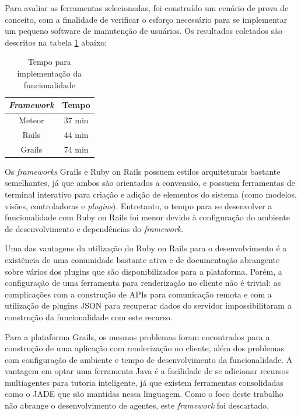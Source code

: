 Para avaliar as ferramentas selecionadas, foi construído um cenário de prova de conceito, com a finalidade de verificar o esforço necessário para se implementar um pequeno software de manutenção de usuários. Os resultados coletados são descritos na tabela \ref{tab:tempo} abaixo:

\begin{table}[h!]
	\centering
	\begin{tabular}{| c | c |}
		\hline
		\textit{Framework} & Tempo \\
		\hline
		Meteor & 37 min \\
		\hline
		Rails & 44 min \\
		\hline
		Grails & 74 min \\
		\hline
	\end{tabular}
	\caption{Tempo para implementação da funcionalidade}
	\label{tab:tempo}
\end{table}

Os \textit{frameworks} Grails e Ruby on Rails possuem estilos arquiteturais bastante semelhantes, já que ambos são orientados a convensão, e possuem ferramentas de terminal interativo para criação e adição de elementos do sistema (como modelos, visões, controladoras e \textit{plugins}). Entretanto, o tempo para se desenvolver a funcionalidade com Ruby on Rails foi menor devido à configuração do ambiente de desenvolvimento e dependências do \textit{framework}.

Uma das vantagens da utilização do Ruby on Rails para o desenvolvimento é a existência de uma comunidade bastante ativa e de documentação abrangente sobre vários dos plugins que são disponibilizados para a plataforma. Porém, a configuração de uma ferramenta para renderização no cliente não é trivial: as complicações com a construção de APIs para comunicação remota e com a utilização de plugins JSON para recuperar dados do servidor impossibilitaram a construção da funcionalidade com este recurso.

Para a plataforma Grails, os mesmos problemas foram encontrados para a construção de uma aplicação com renderização no cliente, além dos problemas com configuração de ambiente e tempo de desenvolvimento da funcionalidade. A vantagem em optar uma ferramenta Java é a facilidade de se adicionar recursos multiagentes para tutoria inteligente, já que existem ferramentas consolidadas como o JADE \cite{jade2015} que são mantidas nessa linguagem. Como o foco deste trabalho não abrange o desenvolvimento de agentes, este \textit{framework} foi descartado.

